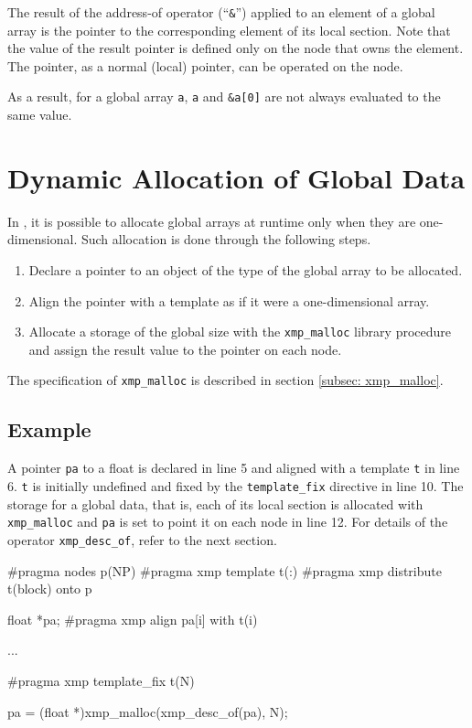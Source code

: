 The result of the address-of operator (``{\tt \&}'') applied to an
element of a global array is the pointer to the corresponding element of
its local section. Note that the value of the result pointer is defined
only on the node that owns the element. The pointer, as a normal (local)
pointer, can be operated on the node.

As a result, for a global array {\tt a}, {\tt a} and {\tt \&a[0]} are
not always evaluated to the same value.

\section{Dynamic Allocation of Global Data}
\label{sec:Dynamic Allocation of Global Data in C}

In {\XMPC}, it is possible to allocate global arrays at runtime only
when they are one-dimensional.
%
Such allocation is done through the following steps.
%
\begin{enumerate}
 \item Declare a pointer to an object of the type of the global array to
       be allocated.
 \item Align the pointer with a template as if it were a one-dimensional
       array.
 \item Allocate a storage of the global size with the {\tt xmp\_malloc}
       library procedure and assign the result value to the
       pointer on each node.
\end{enumerate}
%
The specification of {\tt xmp\_malloc} is described in section
\ref{subsec: xmp_malloc}.

\subsection*{Example}

A pointer {\tt pa} to a float is declared in line 5 and aligned with a
template {\tt t} in line 6. {\tt t} is initially undefined and fixed by
the {\tt template\_fix} directive in line 10. The storage for a global
data, that is, each of its local section is allocated with {\tt
xmp\_malloc} and {\tt pa} is set to point it on each node in line 12. For
details of the operator {\tt xmp\_desc\_of}, refer to the next section.

\begin{XCexample}
#pragma nodes p(NP)
#pragma xmp template t(:)
#pragma xmp distribute t(block) onto p

float *pa;
#pragma xmp align pa[i] with t(i)

...

#pragma xmp template_fix t(N)

pa = (float *)xmp_malloc(xmp_desc_of(pa), N);
\end{XCexample}

